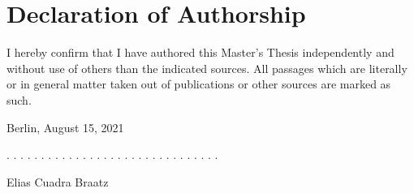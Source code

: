 \documentclass[a4paper,11pt]{article}
\newcommand{\thesistype}{Master's Thesis}
\newcommand{\thesisauthor}{Elias Cuadra Braatz}
\newcommand{\thesisdate}{August 15, 2021}
\begin{document}




\newpage
\thispagestyle{empty}
\hypertarget{declaration-of-authorship}{%
\section*{Declaration of Authorship}\label{declaration-of-authorship}}

I hereby confirm that I have authored this \thesistype{} independently and
without use of others than the indicated sources. All passages which are
literally or in general matter taken out of publications or other sources are
marked as such.
\vspace{1cm}

Berlin, \thesisdate{}
\vspace{3cm}

. . . . . . . . . . . . . . . . . . . . . . . . . . . . . . .
\vspace{0.1cm}

\thesisauthor{}
\end{document}
